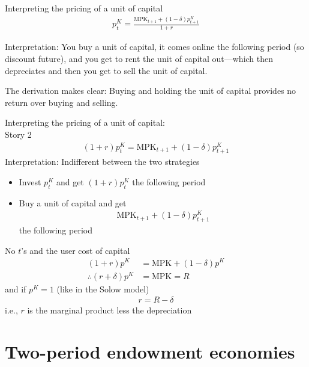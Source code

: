 \documentclass[presentation,dvipsnames]{beamer}
\begin{document}
\begin{frame}[label=sec-2-9]{Interpreting the pricing of a unit of capital}
\begin{align*}
p_{t}^{K} = \frac{\text{MPK}_{t+1} + (1-\delta)p_{t+1}^{K}}{1+r}
\end{align*}

Interpretation: You buy a unit of capital,
it comes online the following period (so discount future), and
you get to rent the unit of capital out---which then depreciates and then you get to sell the unit of capital.

\vspace{1em}

The derivation makes clear: Buying and holding the unit of capital provides no return over buying and selling.
\end{frame}

\begin{frame}[label=sec-2-9]{Interpreting the pricing of a unit of capital: \\ Story 2}
\begin{align*}
(1+r)p_{t}^{K} = \text{MPK}_{t+1} + (1-\delta)p_{t+1}^{K}
\end{align*}
Interpretation: Indifferent between the two strategies
\begin{itemize}[label={--}]
\item Invest $p_{t}^{K}$ and get $(1+r)p_{t}^{K}$ the following period
\item Buy a unit of capital and get
\begin{align*}
\text{MPK}_{t+1} + (1-\delta)p_{t+1}^{K}
\end{align*}
the following period
\end{itemize}
\end{frame}

\begin{frame}[label=sec-2-9]{No $t$'s and the user cost of capital}
\begin{align*}
(1+r)p^{K} &= \text{MPK} + (1-\delta)p^{K} \\
\therefore (r+\delta) p^{K} &= \text{MPK} = R
\end{align*}
and if $p^{K} = 1$ (like in the Solow model)
\begin{align*}
r = R - \delta
\end{align*}
i.e., $r$ is the marginal product less the depreciation
\end{frame}

\section{Two-period endowment economies}
\end{document}
